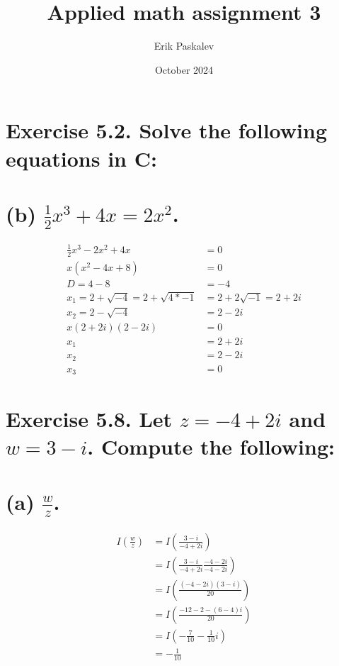 \documentclass[15px]{article}
\title{Applied math assignment 3}
\author{Erik Paskalev}
\date{October 2024}
\begin{document}
\maketitle

\section*{Exercise 5.2. \normalfont Solve the following equations in C:}

\section*{\normalfont (b)  $\frac{1}{2}x^3 + 4x = 2x^2$.}

\begin{equation}
\begin{split}
\frac{1}{2}x^3 - 2x^2 + 4x & = 0 \\
x(x^2 - 4x + 8) & = 0 \\
D = 4 - 8 & = -4 \\
x_1 = 2 + \sqrt{-4} = 2 + \sqrt{4*-1} & = 2 + 2\sqrt{-1} = 2 + 2i \\
x_2 = 2 - \sqrt{-4} & = 2 - 2i \\
x(2 + 2i)(2 - 2i) & = 0 \\
x_1 & = 2 + 2i \\
x_2 & = 2 - 2i \\
x_3 & = 0
\end{split}
\end{equation}

\section*{Exercise 5.8. \normalfont Let $z = -4 + 2i$ and $w = 3 - i$. Compute the following:}

\section*{\normalfont (a)  $\frac{w}{z}$.}

\begin{equation}
\begin{split}
I(\frac{w}{z}) & = I(\frac{3 - i}{-4 + 2i}) \\
& = I(\frac{3 - i}{-4 + 2i} \frac{-4 - 2i}{-4 - 2i}) \\
& = I(\frac{(-4 - 2i)(3 - i)}{20}) \\
& = I(\frac{-12 - 2 - (6 - 4)i}{20}) \\
& = I(-\frac{7}{10} -\frac{1}{10}i) \\ 
& = -\frac{1}{10}
\end{split}
\end{equation}
\end{document}
